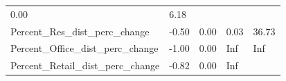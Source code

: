 \documentclass[]{article}
\begin{document}
\begin{longtable}[]{@{}lllll@{}}
\begin{minipage}[t]{0.09\columnwidth}
0.00\strut
\end{minipage} & \begin{minipage}[t]{0.11\columnwidth}\raggedright\strut
6.18\strut
\end{minipage}\tabularnewline
\begin{minipage}[t]{0.49\columnwidth}\raggedright\strut
Percent\_Res\_dist\_perc\_change\strut
\end{minipage} & \begin{minipage}[t]{0.08\columnwidth}\raggedright\strut
-0.50\strut
\end{minipage} & \begin{minipage}[t]{0.09\columnwidth}\raggedright\strut
0.00\strut
\end{minipage} & \begin{minipage}[t]{0.09\columnwidth}\raggedright\strut
0.03\strut
\end{minipage} & \begin{minipage}[t]{0.11\columnwidth}\raggedright\strut
36.73\strut
\end{minipage}\tabularnewline
\begin{minipage}[t]{0.49\columnwidth}\raggedright\strut
Percent\_Office\_dist\_perc\_change\strut
\end{minipage} & \begin{minipage}[t]{0.08\columnwidth}\raggedright\strut
-1.00\strut
\end{minipage} & \begin{minipage}[t]{0.09\columnwidth}\raggedright\strut
0.00\strut
\end{minipage} & \begin{minipage}[t]{0.09\columnwidth}\raggedright\strut
Inf\strut
\end{minipage} & \begin{minipage}[t]{0.11\columnwidth}\raggedright\strut
Inf\strut
\end{minipage}\tabularnewline
\begin{minipage}[t]{0.49\columnwidth}\raggedright\strut
Percent\_Retail\_dist\_perc\_change\strut
\end{minipage} & \begin{minipage}[t]{0.08\columnwidth}\raggedright\strut
-0.82\strut
\end{minipage} & \begin{minipage}[t]{0.09\columnwidth}\raggedright\strut
0.00\strut
\end{minipage} & \begin{minipage}[t]{0.09\columnwidth}\raggedright\strut
Inf\strut

\end{minipage}
\end{longtable}
\end{document}
